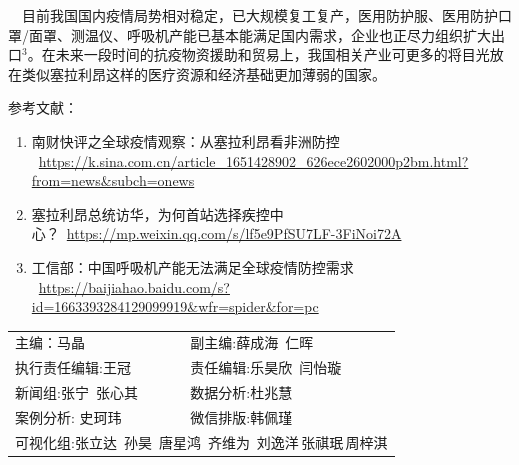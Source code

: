 \documentclass[
]{article}
\begin{document}
\(\quad\)目前我国国内疫情局势相对稳定，已大规模复工复产，医用防护服、医用防护口罩/面罩、测温仪、呼吸机产能已基本能满足国内需求，企业也正尽力组织扩大出口\(^3\)。在未来一段时间的抗疫物资援助和贸易上，我国相关产业可更多的将目光放在类似塞拉利昂这样的医疗资源和经济基础更加薄弱的国家。

\Large 参考文献：

\begin{enumerate}
\def\labelenumi{\arabic{enumi}.}
\item
  南财快评之全球疫情观察：从塞拉利昂看非洲防控
  ~\url{https://k.sina.com.cn/article_1651428902_626ece2602000p2bm.html?from=news\&subch=onews}
\item
  塞拉利昂总统访华，为何首站选择疾控中心？~\url{https://mp.weixin.qq.com/s/lf5e9PfSU7LF-3FiNoi72A}
\item
  工信部：中国呼吸机产能无法满足全球疫情防控需求
  ~\url{https://baijiahao.baidu.com/s?id=1663393284129099919\&wfr=spider\&for=pc}
\end{enumerate}

\centering
\fontsize{12}{12}
\selectfont
\begin{tabular}{ll}

主编：马晶  &  副主编:薛成海\,  仁晖  \\
执行责任编辑:王冠  & 责任编辑:乐昊欣\, 闫怡璇 \\
新闻组:张宁\, 张心其  & 数据分析:杜兆慧 \\
案例分析: 史珂玮  &  微信排版:韩佩瑾 \\
\multicolumn{2}{l}{可视化组:张立达\, 孙昊\, 唐星鸿\, 齐维为\, 刘逸洋\,张祺珉\,周梓淇}

\end{tabular}
\end{document}
